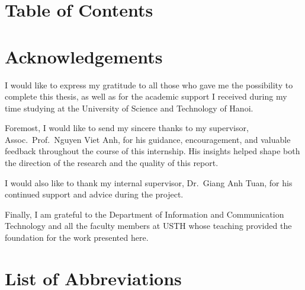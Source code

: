 
\chapter*{Table of Contents}
{\singlespacing
\makeatletter{}\makeatother
}

\clearpage
\chapter*{Acknowledgements}

I would like to express my gratitude to all those who gave me the possibility to complete this thesis, as well as for the academic support I received during my time studying at the University of Science and Technology of Hanoi.

Foremost, I would like to send my sincere thanks to my supervisor, Assoc.\ Prof.\ Nguyen Viet Anh, for his guidance, encouragement, and valuable feedback throughout the course of this internship. His insights helped shape both the direction of the research and the quality of this report.

I would also like to thank my internal supervisor, Dr.\ Giang Anh Tuan, for his continued support and advice during the project.

Finally, I am grateful to the Department of Information and Communication Technology and all the faculty members at USTH whose teaching provided the foundation for the work presented here.

\clearpage
\chapter*{List of Abbreviations}

